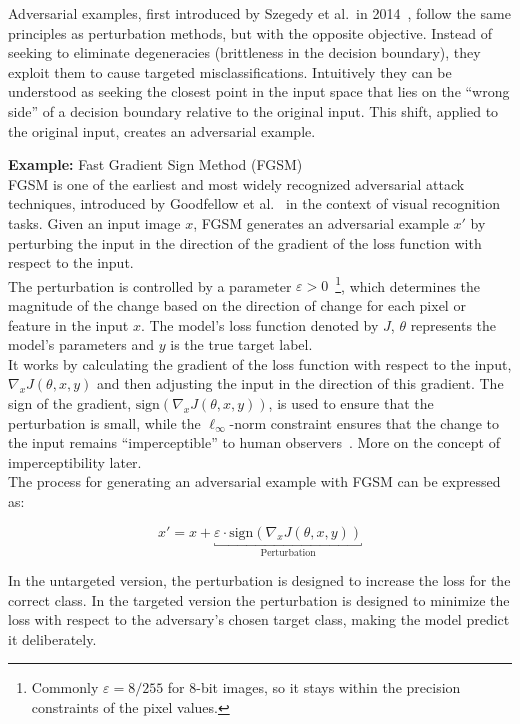 \documentclass[a4paper, oneside]{discothesis}
\begin{document}
Adversarial examples, first introduced by Szegedy et al.\ in 2014~\cite{szegedy2013intriguing}, follow the same principles as perturbation methods, but with the opposite objective. Instead of seeking to eliminate degeneracies (brittleness in the decision boundary), they exploit them to cause targeted misclassifications. Intuitively they can be understood as seeking the closest point in the input space that lies on the ``wrong side'' of a decision boundary relative to the original input. This shift, applied to the original input, creates an adversarial example.

\begin{highlightbox}
	\textbf{Example:} Fast Gradient Sign Method (FGSM) \\

	FGSM is one of the earliest and most widely recognized adversarial attack techniques, introduced by Goodfellow et al.~\cite{goodfellow2014explaining} in the context of visual recognition tasks. Given an input image $x$, FGSM generates an adversarial example $x'$ by perturbing the input in the direction of the gradient of the loss function with respect to the input.\\

	The perturbation is controlled by a parameter $\varepsilon > 0$~\footnote{Commonly $\varepsilon = 8/255$ for 8-bit images, so it stays within the precision constraints of the pixel values.}, which determines the magnitude of the change based on the direction of change for each pixel or feature in the input $x$. The model's loss function denoted by $J$, $\theta$ represents the model's parameters and $y$ is the true target label. \\
	
	It works by calculating the gradient of the loss function with respect to the input, $\nabla_x J(\theta, x, y)$ and then adjusting the input in the direction of this gradient. The sign of the gradient, $\text{sign}(\nabla_x J(\theta, x, y))$, is used to ensure that the perturbation is small, while the $\ell_\infty$-norm constraint ensures that the change to the input remains ``imperceptible'' to human observers~\cite{goodfellow2014explaining, zhang2019adversarial}. More on the concept of imperceptibility later.\\
	
	The process for generating an adversarial example with FGSM can be expressed as:
	
	$$x' = x + \underbracket{\varepsilon \cdot \text{sign}(\nabla_x J(\theta, x, y))}_{\text{Perturbation}}$$
	
	In the untargeted version, the perturbation is designed to increase the loss for the correct class. In the targeted version the perturbation is designed to minimize the loss with respect to the adversary's chosen target class, making the model predict it deliberately.
\end{highlightbox}
\end{document}
